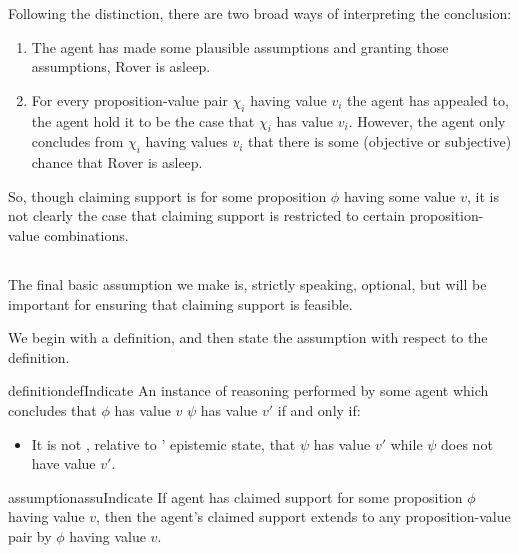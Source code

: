 \begin{note}[Suppositions]
  Following the distinction, there are two broad ways of interpreting the conclusion:
  \begin{enumerate}
  \item
    The agent has made some plausible assumptions and granting those assumptions, Rover is asleep.
  \item
    For every proposition-value pair \(\chi_{i}\) having value \(v_{i}\) the agent has appealed to, the agent hold it to be the case that \(\chi_{i}\) has value \(v_{i}\).
    However, the agent only concludes from \(\chi_{i}\) having values \(v_{i}\) that there is some (objective or subjective) chance that Rover is asleep.
  \end{enumerate}
  So, though claiming support is for some proposition \(\phi\) having some value \(v\), it is not clearly the case that claiming support is restricted to certain proposition-value combinations.
\end{note}


\subsection{}
\label{sec:basic-assumptions:indication}

\begin{note}
  The final basic assumption we make is, strictly speaking, optional, but will be important for ensuring that claiming support is feasible.

  We begin with a definition, and then state the assumption with respect to the definition.
\end{note}

\begin{note}
  \begin{restatable}[\indicateN{2}]{definition}{defIndicate}
    \label{def:indication}
    An instance of reasoning performed by some agent \vAgent{} which concludes that \(\phi\) has value \(v\) \emph{} \(\psi\) has value \(v'\) if and only if:
    \begin{itemize}
    \item It is not \epPAd{}, relative to \vAgent{}' epistemic state, that \(\psi\) has value \(v'\) while \(\psi\) does not have value \(v'\).
    \end{itemize}
    \vspace{-\baselineskip}
  \end{restatable}
\end{note}

\begin{note}
  \begin{restatable}[\indicateN{2}]{assumption}{assuIndicate}
    \label{assu:indication}
    If agent has claimed support for some proposition \(\phi\) having value \(v\), then the agent's claimed support extends to any proposition-value pair \indicateVed{} by \(\phi\) having value \(v\).
  \end{restatable}
\end{note}

